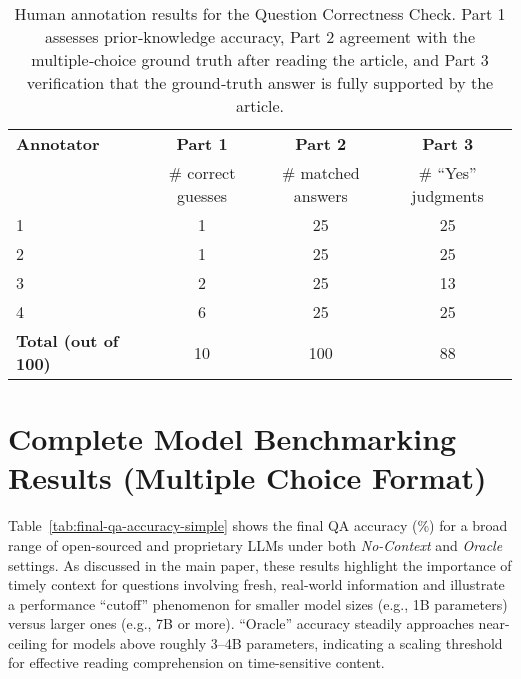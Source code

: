 \documentclass[11pt]{article}
\begin{document}
\begin{table*}[t]
    \centering
    \begin{tabular}{lccc}
        \toprule
        \textbf{Annotator} &
        \textbf{Part 1} &
        \textbf{Part 2} &
        \textbf{Part 3} \\
        & \small\# correct guesses &
        \small\# matched answers &
        \small\# “Yes” judgments \\
        \midrule
        1 & 1 & 25 & 25 \\
        2 & 1 & 25 & 25 \\
        3 & 2 & 25 & 13 \\
        4 & 6 & 25 & 25 \\
        \midrule
        \textbf{Total (out of 100)} & 10 & 100 & 88 \\
        \bottomrule
    \end{tabular}
    \caption{Human annotation results for the Question Correctness Check.
    Part 1 assesses prior‑knowledge accuracy,
    Part 2 agreement with the multiple‑choice ground truth after reading the
    article, and Part 3 verification that the ground‑truth answer is fully
    supported by the article.}
    \label{tab:qc_results}
\end{table*}



\clearpage
\section{Complete Model Benchmarking Results (Multiple Choice Format)}
\label{sec:appendix-model-results}

Table~\ref{tab:final-qa-accuracy-simple} shows the final QA accuracy (\%) for a broad range of open-sourced and proprietary LLMs under both \emph{No-Context} and \emph{Oracle} settings. 
As discussed in the main paper, these results highlight the importance of timely context for questions involving fresh, real-world information and illustrate a performance ``cutoff'' phenomenon for smaller model sizes (e.g., 1B parameters) versus larger ones (e.g., 7B or more). 
``Oracle'' accuracy steadily approaches near-ceiling for models above roughly 3--4B parameters, indicating a scaling threshold for effective reading comprehension on time-sensitive content.
\end{document}
